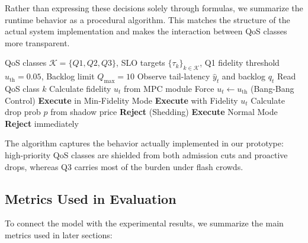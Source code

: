 \documentclass[journal]{IEEEtran}
\begin{document}
Rather than expressing these decisions solely through formulas, we
summarize the runtime behavior as a procedural algorithm. This matches
the structure of the actual system implementation and makes the
interaction between QoS classes more transparent.

\begin{algorithm}[!htbp]
  \caption{QoS-aware Admission and Execution with Fidelity Scaling}
  \label{alg:qos-runtime}
  \begin{algorithmic}[1]
    \Require QoS classes $\mathcal{K} = \{Q1,Q2,Q3\}$,
             SLO targets $\{\tau_k\}_{k\in\mathcal{K}}$,
             Q1 fidelity threshold $u_{\text{th}} = 0.05$,
             Backlog limit $Q_{\max} = 10$
    \State Observe tail-latency $\hat{y}_t$ and backlog $q_t$
      \State Read QoS class $k$
       
        \State Calculate fidelity $u_t$ from MPC module
         
          \State Force $u_t \leftarrow u_{\text{th}}$ (Bang-Bang Control)
          \State \textbf{Execute} in Min-Fidelity Mode
        \Else
          \State \textbf{Execute} with Fidelity $u_t$
        \EndIf
       
        \State Calculate drop prob $p$ from shadow price
          \State \textbf{Reject} (Shedding)
        \Else
          \State \textbf{Execute} Normal Mode
        \EndIf
      \Else {}
         
           \State \textbf{Reject} immediately
        \EndIf
      \EndIf
    \EndFor
  \end{algorithmic}
\end{algorithm}

The algorithm captures the behavior actually implemented in our
prototype: high-priority QoS classes are shielded from both admission
cuts and proactive drops, whereas Q3 carries most of the burden under
flash crowds.

\subsection{Metrics Used in Evaluation}
\label{subsec:qos-metrics}

To connect the model with the experimental results, we summarize the
main metrics used in later sections:
\end{document}
